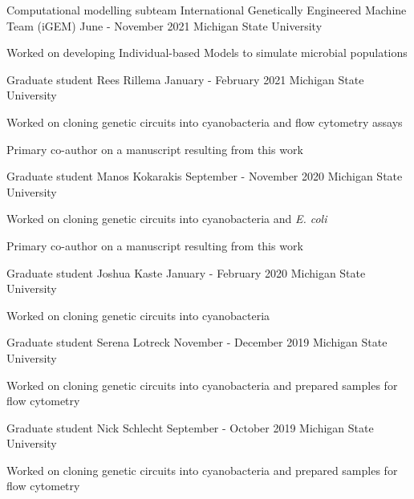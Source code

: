 \documentclass[11pt, letterpaper]{awesome-cv} %
\begin{document}
\begin{sloppypar}
\begin{cventries}
	
	\cventry
	{Computational modelling subteam}
	{International Genetically Engineered Machine Team (iGEM)}
	{June - November 2021}
	{Michigan State University}
	{
	  \begin{cvitems}
		\item {Worked on developing Individual-based Models to simulate microbial populations}
	  \end{cvitems}
	}
	\cventry
	{Graduate student}
	{Rees Rillema}
	{January - February 2021}
	{Michigan State University}
	{
	  \begin{cvitems}
	    \item {Worked on cloning genetic circuits into cyanobacteria and flow cytometry assays}
	    \item {Primary co-author on a manuscript resulting from this work}
	  \end{cvitems}
	}	
	\cventry
	{Graduate student}
	{Manos Kokarakis}
	{September - November 2020}
	{Michigan State University}
	{
		\begin{cvitems}
			\item {Worked on cloning genetic circuits into cyanobacteria and \textit{E. coli}}
			\item {Primary co-author on a manuscript resulting from this work}
		\end{cvitems}
	}
	\cventry
	{Graduate student}
	{Joshua Kaste}
	{January - February 2020}
	{Michigan State University}
	{
		\begin{cvitems}
			\item {Worked on cloning genetic circuits into cyanobacteria}
		\end{cvitems}
	}
	
	\cventry
	{Graduate student}
	{Serena Lotreck}
	{November - December 2019}
	{Michigan State University}
	{
		\begin{cvitems}
			\item {Worked on cloning genetic circuits into cyanobacteria and prepared samples for flow cytometry}
		\end{cvitems}	
}
	
	\cventry
	{Graduate student}
	{Nick Schlecht}
	{September - October 2019}
	{Michigan State University}
	{
		\begin{cvitems}
			\item {Worked on cloning genetic circuits into cyanobacteria and prepared samples for flow cytometry}
		\end{cvitems}	
}
	

\end{cventries}
\end{sloppypar}
\end{document}
